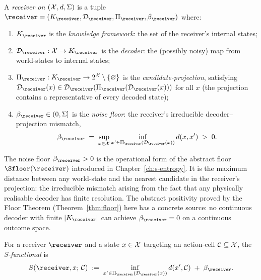 \begin{definition}\label{def:receiver-outcome}
A \emph{receiver on $(\mathcal{X}, d, \Sigma)$} is a tuple $\receiver = (K_\receiver, \mathcal{D}_\receiver, \Pi_\receiver, \NoiseFloor_\receiver)$ where:
\begin{enumerate}[nosep, label=(\roman*)]
  \item $K_\receiver$ is the \emph{knowledge framework}: the set of the receiver's internal states;
  \item $\mathcal{D}_\receiver : \OutcomeX \to K_\receiver$ is the \emph{decoder}: the (possibly noisy) map from world-states to internal states;
  \item $\Pi_\receiver : K_\receiver \to 2^{\OutcomeX} \setminus \{\varnothing\}$ is the \emph{candidate-projection}, satisfying $\mathcal{D}_\receiver(x) \in \mathcal{D}_\receiver(\Pi_\receiver(\mathcal{D}_\receiver(x)))$ for all $x$ (the projection contains a representative of every decoded state);
  \item $\NoiseFloor_\receiver \in (0, \Sigma]$ is the \emph{noise floor}: the receiver's irreducible decoder--projection mismatch,
        \[
        \NoiseFloor_\receiver \;=\; \sup_{x \in \OutcomeX} \inf_{x' \in \Pi_\receiver(\mathcal{D}_\receiver(x))} d(x, x') \;>\; 0.
        \]
\end{enumerate}
\end{definition}

The noise floor $\NoiseFloor_\receiver > 0$ is the operational form of the abstract floor $\Sfloor(\receiver)$ introduced in Chapter~\ref{ch:s-entropy}. It is the maximum distance between any world-state and the nearest candidate in the receiver's projection: the irreducible mismatch arising from the fact that any physically realisable decoder has finite resolution. The abstract positivity proved by the Floor Theorem (Theorem~\ref{thm:floor}) here has a concrete source: no continuous decoder with finite $|K_\receiver|$ can achieve $\NoiseFloor_\receiver = 0$ on a continuous outcome space.

\begin{definition}\label{def:S-outcome}
For a receiver $\receiver$ and a state $x \in \mathcal{X}$ targeting an action-cell $\mathcal{C} \subseteq \mathcal{X}$, the \emph{S-functional} is
\[
S(\receiver, x;\, \Cell) \;:=\; \inf_{x' \in \Pi_\receiver(\mathcal{D}_\receiver(x))} d(x', \Cell) \;+\; \NoiseFloor_\receiver.
\]
\end{definition}

